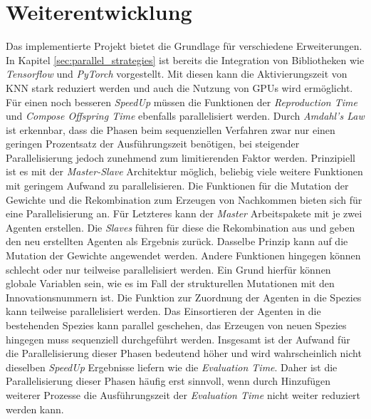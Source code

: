\section{Weiterentwicklung}
\label{sec:future_work}
Das implementierte Projekt bietet die Grundlage für verschiedene Erweiterungen. In Kapitel \ref{sec:parallel_strategies} ist bereits die Integration von Bibliotheken wie \emph{Tensorflow} und \emph{PyTorch} vorgestellt. Mit diesen kann die Aktivierungszeit von \ac{KNN} stark reduziert werden und auch die Nutzung von \acp{GPU} wird ermöglicht. Für einen noch besseren \emph{SpeedUp} müssen die Funktionen der  \emph{Reproduction Time} und \emph{Compose Offspring Time} ebenfalls parallelisiert werden. Durch \emph{Amdahl's Law} ist erkennbar, dass die Phasen beim sequenziellen Verfahren zwar nur einen geringen Prozentsatz der Ausführungszeit benötigen, bei steigender Parallelisierung jedoch zunehmend zum limitierenden Faktor werden. Prinzipiell ist es mit der \emph{Master-Slave} Architektur möglich, beliebig viele weitere Funktionen mit geringem Aufwand zu parallelisieren. Die Funktionen für die Mutation der Gewichte und die Rekombination zum Erzeugen von Nachkommen bieten sich für eine Parallelisierung an. Für Letzteres kann der \emph{Master} Arbeitspakete mit je zwei Agenten erstellen. Die \emph{Slaves} führen für diese die Rekombination aus und geben den neu erstellten Agenten als Ergebnis zurück. Dasselbe Prinzip kann auf die Mutation der Gewichte angewendet werden. Andere Funktionen hingegen können schlecht oder nur teilweise parallelisiert werden. Ein Grund hierfür können globale Variablen sein, wie es im Fall der strukturellen Mutationen mit den Innovationsnummern ist. Die Funktion zur Zuordnung der Agenten in die Spezies kann teilweise parallelisiert werden. Das Einsortieren der Agenten in die bestehenden Spezies kann parallel geschehen, das Erzeugen von neuen Spezies hingegen muss sequenziell durchgeführt werden. Insgesamt ist der Aufwand für die Parallelisierung dieser Phasen bedeutend höher und wird wahrscheinlich nicht dieselben \emph{SpeedUp} Ergebnisse liefern wie die \emph{Evaluation Time}. Daher ist die Parallelisierung dieser Phasen häufig erst sinnvoll, wenn durch Hinzufügen weiterer Prozesse die Ausführungszeit der \emph{Evaluation Time} nicht weiter reduziert werden kann. 


